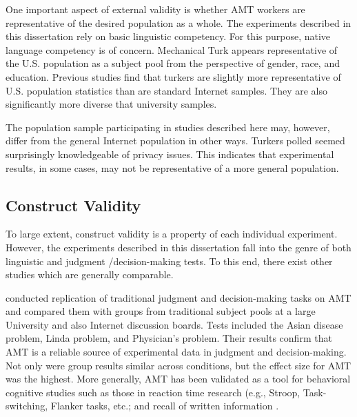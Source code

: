 One important aspect of external validity is whether AMT workers are representative of the desired population as a whole. The experiments described in this dissertation rely on basic linguistic competency. For this purpose, native language competency is of concern. Mechanical Turk appears representative of the U.S. population as a subject pool from the perspective of gender, race, and education. Previous studies  \citep{Behrend:2011dx,Buhrmester:2010ur}  find that turkers are slightly more representative of U.S. population statistics than are standard Internet samples. They are also significantly more diverse that university samples. 

The population sample participating in studies described here may, however, differ from the general Internet population in other ways. Turkers polled seemed surprisingly knowledgeable of privacy issues. This indicates that experimental results, in some cases, may not be representative of a more general population.

\subsection{Construct Validity}
\label{constructvalidity}

To large extent, construct validity is a property of each individual experiment. However, the experiments described in this dissertation fall into the genre of both linguistic and judgment \slash  decision-making tests. To this end, there exist other studies which are generally comparable. 

 \cite{Paolacci:2010ws}  conducted replication of traditional judgment and decision-making tasks on AMT and compared them with groups from traditional subject pools at a large University and also Internet discussion boards. Tests included the  \cite{Kahneman:1984td}  Asian disease problem,  \cite{Kahneman:1983tb}  Linda problem, and  \cite{Baron:1988ty}  Physician's problem. Their results confirm that AMT is a reliable source of experimental data in judgment and decision-making. Not only were group results similar across conditions, but the effect size for AMT was the highest. More generally, AMT has been validated as a tool for behavioral cognitive studies such as those in reaction time research (e.g., Stroop, Task-switching, Flanker tasks, etc.;  \citep{Crump:2013fn}  and recall of written information  \citep{Tietze:2009wn}. 

